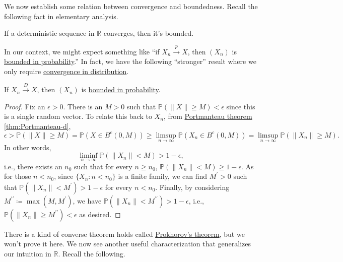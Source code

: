 We now establish some relation between convergence and boundedness. Recall the following fact in elementary analysis.

\begin{prev}
	If a deterministic sequence in \(\mathbb{R} \) converges, then it's bounded.
\end{prev}

In our context, we might expect something like ``if \(X_n \overset{p}{\to } X \), then \((X_n)\) is \hyperref[def:bounded-in-probability]{bounded in probability}.'' In fact, we have the following ``stronger'' result where we only require \hyperref[def:converge-in-distribution]{convergence in distribution}.

\begin{proposition}\label{prop:convergence-in-distirbution-bounded-in-probability}
	If \(X_n \overset{D}{\to } X\), then \((X_n)\) is \hyperref[def:bounded-in-probability]{bounded in probability}.
\end{proposition}
\begin{proof}
	Fix an \(\epsilon > 0\). There is an \(M > 0\) such that \(\mathbb{P} (\lVert X \rVert \geq M) < \epsilon \) since this is a single random vector. To relate this back to \(X_n\), from \hyperref[thm:Portmanteau]{Portmanteau theorem} \autoref{thm:Portmanteau-d},
	\[
		\epsilon
		> \mathbb{P} (\lVert X \rVert \geq M)
		= \mathbb{P} (X \in B^{c} (0, M))
		\geq \limsup_{n \to \infty} \mathbb{P} (X_n \in B^{c} (0, M))
		= \limsup_{n \to \infty} \mathbb{P} (\lVert X_n \rVert \geq M).
	\]
	In other words,
	\[
		\liminf_{n \to \infty} \mathbb{P} (\lVert X_n \rVert < M) > 1 - \epsilon,
	\]
	i.e., there exists an \(n_0\) such that for every \(n \geq n_0\), \(\mathbb{P} (\lVert X_n \rVert < M) \geq 1 - \epsilon \). As for those \(n < n_0\), since \(\{ X_n \colon n < n_0 \} \) is a finite family, we can find \(M^{\prime} > 0\) such that \(\mathbb{P} (\lVert X_n \rVert < M^{\prime} ) > 1 - \epsilon \) for every \(n < n_0\). Finally, by considering \(M^{\prime\prime} \coloneqq \max (M, M^{\prime} )\), we have \(\mathbb{P} (\lVert X_n \rVert < M^{\prime\prime} ) > 1 - \epsilon \), i.e., \(\mathbb{P} (\lVert X_n \rVert \geq M^{\prime\prime} ) < \epsilon \) as desired.
\end{proof}

There is a kind of converse theorem holds called \href{https://en.wikipedia.org/wiki/Prokhorov's_theorem}{Prokhorov's theorem}, but we won't prove it here. We now see another useful characterization that generalizes our intuition in \(\mathbb{R} \). Recall the following.

